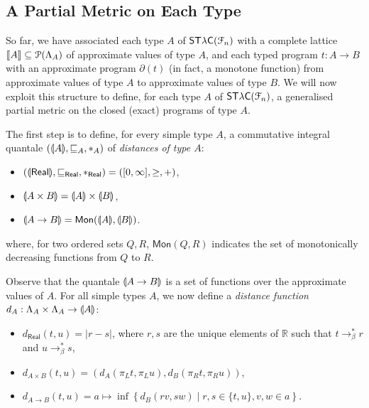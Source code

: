 \subsection{A Partial Metric on Each Type}
\label{subsection:type-gpms}

So far, we have associated each type $A$ of $\mathsf{ST\lambda C}(\mathcal F_{n})$ with a complete lattice $\llbracket A \rrbracket\subseteq \mathcal P(\Lambda_{A})$ of approximate values of type $A$, and each typed program $t:A\to B$ with an approximate program $\partial(t)$ (in fact, a monotone function) from approximate values of type $A$ to approximate values of type $B$.
We will now exploit this structure to define, for each type $A$ of $\mathsf{ST\lambda C}(\mathcal F_{n})$, a generalised partial metric on the closed (exact) programs of type $A$. %



The first step is to define, for every simple type $A$, a commutative integral quantale $(\llparenthesis A \rrparenthesis, \sqsubseteq_A, \mathbin{\ast}_A)$ of \emph{distances of type $A$}:
\begin{itemize}
\item $(\llparenthesis \mathsf{Real} \rrparenthesis, \sqsubseteq_\mathsf{Real}, \mathbin{\ast}_\mathsf{Real}) = ([0,\infty], \geq, +)$,
\item $\llparenthesis A \times B \rrparenthesis = \llparenthesis A \rrparenthesis \times \llparenthesis B \rrparenthesis$,
\item $\llparenthesis A \to B \rrparenthesis =\mathsf{Mon}(\llparenthesis A \rrparenthesis, \llparenthesis B \rrparenthesis)$.
\end{itemize}
where, for two ordered sets $Q,R$, $\mathsf{Mon}(Q,R)$ indicates the set of monotonically decreasing functions from $Q$ to $R$.


Observe that the quantale $\llparenthesis A\to B \rrparenthesis$ is a set of functions over the approximate values of $A$.
For all simple types $A$, we now define a \emph{distance function} $d_A : \Lambda_A \times \Lambda_A \to \llparenthesis A \rrparenthesis$:
\begin{itemize}
\item $d_\mathsf{Real}(t,u) = \left\vert r-s \right\vert$, where $r,s$ are the unique elements of $\mathbb{R}$ such that $t \to_\beta^* r$ and $u \to_\beta^* s$,
\item $d_{A \times B}(t,u) = (d_A(\pi_L t, \pi_L u), d_B(\pi_R t, \pi_R u))$,
\item $d_{A \to B}(t,u) = a \mapsto \inf \left\{ d_B(rv, sw) \mid r,s \in \{t,u\}, v,w \in a \right\}$.
\end{itemize}


